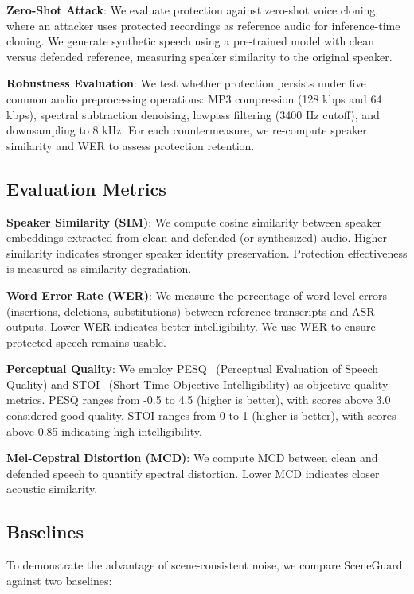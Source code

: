 \textbf{Zero-Shot Attack}: We evaluate protection against zero-shot voice cloning, where an attacker uses protected recordings as reference audio for inference-time cloning. We generate synthetic speech using a pre-trained model with clean versus defended reference, measuring speaker similarity to the original speaker.

\textbf{Robustness Evaluation}: We test whether protection persists under five common audio preprocessing operations: MP3 compression (128 kbps and 64 kbps), spectral subtraction denoising, lowpass filtering (3400 Hz cutoff), and downsampling to 8 kHz. For each countermeasure, we re-compute speaker similarity and WER to assess protection retention.

\subsection{Evaluation Metrics}

\textbf{Speaker Similarity (SIM)}: We compute cosine similarity between speaker embeddings extracted from clean and defended (or synthesized) audio. Higher similarity indicates stronger speaker identity preservation. Protection effectiveness is measured as similarity degradation.

\textbf{Word Error Rate (WER)}: We measure the percentage of word-level errors (insertions, deletions, substitutions) between reference transcripts and ASR outputs. Lower WER indicates better intelligibility. We use WER to ensure protected speech remains usable.

\textbf{Perceptual Quality}: We employ PESQ~\citep{pesq} (Perceptual Evaluation of Speech Quality) and STOI~\citep{stoi} (Short-Time Objective Intelligibility) as objective quality metrics. PESQ ranges from -0.5 to 4.5 (higher is better), with scores above 3.0 considered good quality. STOI ranges from 0 to 1 (higher is better), with scores above 0.85 indicating high intelligibility.

\textbf{Mel-Cepstral Distortion (MCD)}: We compute MCD between clean and defended speech to quantify spectral distortion. Lower MCD indicates closer acoustic similarity.

\subsection{Baselines}

To demonstrate the advantage of scene-consistent noise, we compare SceneGuard against two baselines:

